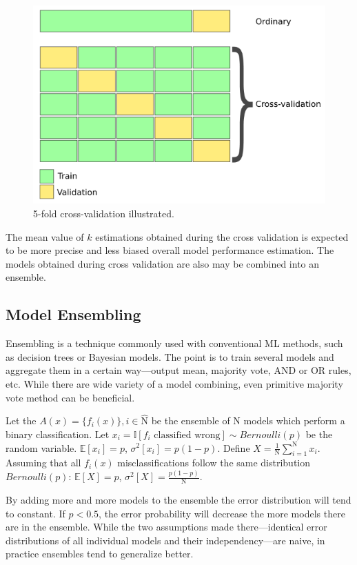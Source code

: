 \documentclass[thesis=B,english]{FITthesis}[2019/12/23]
\begin{document}
\begin{figure}[h]
	\centering
	\includegraphics[scale=0.5]{images/cross_validation.png}
	\caption{5-fold cross-validation illustrated.}
\end{figure}

The mean value of $k$ estimations obtained during the cross validation is expected to be more precise and less biased overall model performance estimation. The models obtained during cross validation are also may be combined into an ensemble.

\subsection{Model Ensembling}

Ensembling is a technique commonly used with conventional ML methods, such as decision trees or Bayesian models. The point is to train several models and aggregate them in a certain way---output mean, majority vote, AND or OR rules, etc. While there are wide variety of a model combining, even primitive majority vote method can be beneficial.

Let the $A(x) = \{f_i(x)\}, i \in \hat{\text{N} }$ be the ensemble of N models which perform a binary classification. Let $x_i = \mathbb{I}[f_i \text{ classified wrong}] \sim Bernoulli(p)$ be the random variable. $\mathbb{E}[x_i] = p$, $\sigma^2[x_i] = p(1-p)$. Define $X = \frac{1}{\text{N} } \sum_{i = 1}^{\text{N} } x_i$. Assuming that all $f_i(x)$ misclassifications follow the same distribution $Bernoulli(p)$: $\mathbb{E}[X] = p$, $\sigma^2[X] = \frac{p(1-p)}{\text{N} }$.

By adding more and more models to the ensemble the error distribution will tend to constant. If $p < 0.5$, the error probability will decrease the more models there are in the ensemble. While the two assumptions made there---identical error distributions of all individual models and their independency---are naive, in practice ensembles tend to generalize better.
\end{document}
